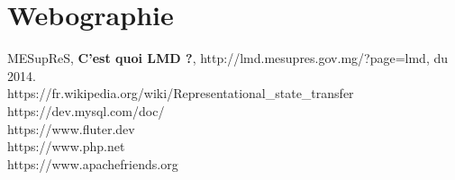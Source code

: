 \chapter*{Webographie}
\noindent [5] MESupReS, \textbf{C'est quoi LMD ?}, http://lmd.mesupres.gov.mg/?page=lmd, du 2014.  \\

\noindent [6] https://fr.wikipedia.org/wiki/Representational\_state\_transfer \\


\noindent [7] https://dev.mysql.com/doc/\\

\noindent [8] https://www.fluter.dev\\

\noindent [9] https://www.php.net\\

\noindent [9] https://www.apachefriends.org\\


